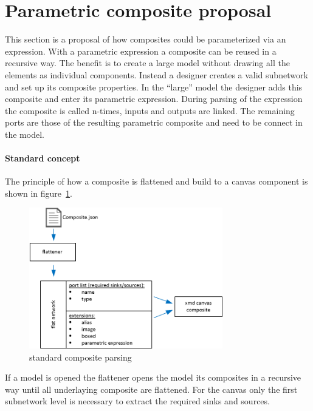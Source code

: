 \section{Parametric composite proposal}

This section is a proposal of how composites could be parameterized via
an expression. With a parametric expression a composite can be reused in a
recursive way. The benefit is to create a large model without drawing all the
elements as individual components. Instead a designer creates a valid subnetwork
and set up its composite properties. In the ``large'' model the designer adds
this composite and enter its parametric expression. During parsing of the
expression the composite is called n-times, inputs and outputs are linked. The
remaining ports are those of the resulting parametric composite and need to be
connect in the model.

\paragraph{Standard concept}

The principle of how a composite is flattened and build to a canvas component is
shown in figure~\ref{fig:standard-composite-parsing}.

\begin{figure}[here]
\includegraphics[width=0.75\textwidth]{pictures/composite-parsing}
\caption{standard composite parsing}
\label{fig:standard-composite-parsing}
\end{figure}

If a model is opened the flattener opens the model its composites in a recursive
way until all underlaying composite are flattened. For the canvas only the first
subnetwork level is necessary to extract the required sinks and sources.

